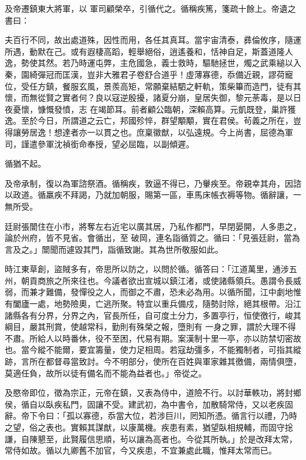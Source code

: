 \begin{pinyinscope}
 及帝遷鎮東大將軍，以
 軍司顧榮卒，引循代之。循稱疾篤，箋疏十餘上。帝遺之書曰：



 夫百行不同，故出處道殊，因性而用，各任其真耳。當宇宙清泰，彞倫攸序，隨運所遇，動默在己。或有遐棲高蹈，輕舉絕俗，逍遙養和，恬神自足，斯蓋道隆人逸，勢使其然。若乃時運屯弊，主危國急，義士救時，驅馳拯世，燭之武乘縋以入秦，園綺彈冠而匡漢，豈非大雅君子卷舒合道乎！虛薄寡德，忝備近親，謬荷寵位，受任方鎮，餐服玄風，景羨高矩，常願棄結駟之軒軌，策柴篳而造門，徒有其懷，而無從賢之實者何？良以寇逆殷擾，諸夏分崩，皇居失御，黎元荼毒，是以日夜憂懷，慷慨發憤，志
 在竭節耳。前者顧公臨朝，深賴高算。元凱既登，巢許獲逸。至於今日，所謂道之云亡，邦國殄悴，群望顒顒，實在君侯。茍義之所在，豈得讓勞居逸！想達者亦一以貫之也。庶稟徽猷，以弘遠規。今上尚書，屈德為軍司，謹遣參軍沈禎銜命奉授，望必屈臨，以副傾遲。



 循猶不起。



 及帝承制，復以為軍諮祭酒。循稱疾，敦逼不得已，乃轝疾至。帝親幸其舟，因諮以政道。循羸疾不拜謁，乃就加朝服，賜第一區，車馬床帳衣褥等物。循辭讓，一無所受。



 廷尉張闓住在小市，將奪左右近宅以廣其居，乃私作都門，早閉晏開，人多患之，論於州府，皆不見省。會循出，至
 破岡，連名詣循質之。循曰：「見張廷尉，當為言及之。」闓聞而遽毀其門，詣循致謝。其為世所敬服如此。



 時江東草創，盜賊多有，帝思所以防之，以問於循。循答曰：「江道萬里，通涉五州，朝貢商旅之所來往也。今議者欲出宣城以鎮江渚，或使諸縣領兵。愚謂令長威弱，而兼才難備，發憚役之人，而御之不肅，恐未必為用。以循所聞，江中劇地惟有闔廬一處，地勢險奧，亡逃所聚。特宜以重兵備戍，隨勢討除，絕其根帶。沿江諸縣各有分界，分界之內，官長所任，自可度土分力，多置亭行，恒使徼行，峻其綱目，嚴其刑賞，使越常科，勤則有殊榮之報，墮則有
 一身之罪，謂於大理不得不肅。所給人以時番休，役不至困，代易有期。案漢制十里一亭，亦以防禁切密故也。當今縱不能爾，要宜籌量，使力足相周。若寇劫彊多，不能獨制者，可指其縱跡，言所在都督尋當致討。今不明部分，使所在百姓與軍家雜其徼備，兩情俱墮，莫適任負，故所以徒有備名而不能為益者也。」帝從之。



 及愍帝即位，徵為宗正，元帝在鎮，又表為侍中，道險不行。以討華軼功，將封鄉侯，循自以臥疾私門，固讓不受。建武初，為中書令，加散騎常侍，又以老疾固辭。帝下令曰：「孤以寡德，忝當大位，若涉巨川，罔知所憑。循言行以禮，乃時
 之望，俗之表也。實賴其謀猷，以康萬機。疾患有素，猶望臥相規輔，而固守捴謙，自陳懇至，此賢履信思順，茍以讓為高者也。今從其所執。」於是改拜太常，常侍如故。循以九卿舊不加官，今又疾患，不宜兼處此職，惟拜太常而已。




\end{pinyinscope}
